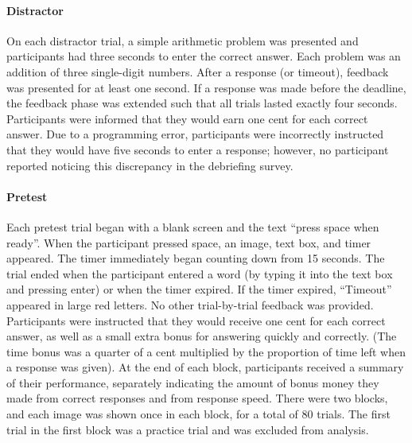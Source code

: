 \paragraph{Distractor} On each distractor trial, a simple arithmetic problem was presented and participants had three seconds to enter the correct answer. Each problem was an addition of three single-digit numbers. After a response (or timeout), feedback was presented for at least one second. If a response was made before the deadline, the feedback phase was extended such that all trials lasted exactly four seconds. Participants were informed that they would earn one cent for each correct answer. Due to a programming error, participants were incorrectly instructed that they would have five seconds to enter a response; however, no participant reported noticing this discrepancy in the debriefing survey.

\paragraph{Pretest} Each pretest trial began with a blank screen and the text ``press space when ready''. When the participant pressed space, an image, text box, and timer appeared. The timer immediately began counting down from 15 seconds. The trial ended when the participant entered a word (by typing it into the text box and pressing enter) or when the timer expired. If the timer expired, ``Timeout'' appeared in large red letters. No other trial-by-trial feedback was provided. Participants were instructed that they would receive one cent for each correct answer, as well as a small extra bonus for answering quickly and correctly. (The time bonus was a quarter of a cent multiplied by the proportion of time left when a response was given). At the end of each block, participants received a summary of their performance, separately indicating the amount of bonus money they made from correct responses and from response speed. There were two blocks, and each image was shown once in each block, for a total of 80 trials. The first trial in the first block was a practice trial and was excluded from analysis.


